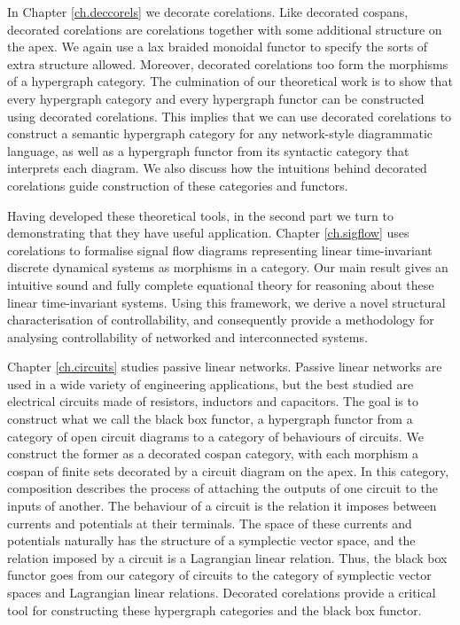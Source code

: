 In Chapter \ref{ch.deccorels} we decorate corelations. Like decorated cospans,
decorated corelations are corelations together with some additional structure on
the apex. We again use a lax braided monoidal functor to specify the sorts of
extra structure allowed. Moreover, decorated corelations too form the morphisms
of a hypergraph category. The culmination of our theoretical work is to show
that every hypergraph category and every hypergraph functor can be constructed
using decorated corelations. This implies that we can use decorated corelations
to construct a semantic hypergraph category for any network-style diagrammatic
language, as well as a hypergraph functor from its syntactic category that
interprets each diagram. We also discuss how the intuitions behind decorated
corelations guide construction of these categories and functors.

%


Having developed these theoretical tools, in the second part we turn to
demonstrating that they have useful application. Chapter \ref{ch.sigflow}
uses corelations to formalise signal flow diagrams representing linear
time-invariant discrete dynamical systems as morphisms in a category.
Our main result gives an intuitive sound and fully complete equational theory
for reasoning about these linear time-invariant systems. Using this framework,
we derive a novel structural characterisation of controllability, and
consequently provide a methodology for analysing controllability of networked
and interconnected systems.

Chapter \ref{ch.circuits} studies passive linear networks. Passive linear
networks are used in a wide variety of engineering applications, but the best
studied are electrical circuits made of resistors, inductors and capacitors. The
goal is to construct what we call the black box functor, a hypergraph functor
from a category of open circuit diagrams to a category of behaviours of
circuits. We construct the former as a decorated cospan category, with each morphism
a cospan of finite sets decorated by a circuit diagram on the apex. In this
category, composition describes the process of attaching the outputs of one
circuit to the inputs of another. The behaviour of a circuit is the relation it
imposes between currents and potentials at their terminals. The space of these
currents and potentials naturally has the structure of a symplectic vector
space, and the relation imposed by a circuit is a Lagrangian linear relation.
Thus, the black box functor goes from our category of circuits to the category
of symplectic vector spaces and Lagrangian linear relations. Decorated
corelations provide a critical tool for constructing these hypergraph categories
and the black box functor.

